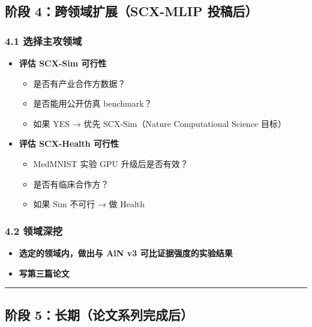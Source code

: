 \documentclass[
  12pt,
]{ctexart}
\providecommand{\tightlist}{%
  \setlength{\itemsep}{0pt}\setlength{\parskip}{0pt}}
\begin{document}
\subsection{阶段 4：跨领域扩展（SCX-MLIP
投稿后）}\label{ux9636ux6bb5-4ux8de8ux9886ux57dfux6269ux5c55scx-mlip-ux6295ux7a3fux540e}

\subsubsection{4.1
选择主攻领域}\label{ux9009ux62e9ux4e3bux653bux9886ux57df}

\begin{itemize}
\tightlist
\item[$\square$]
  \textbf{评估 SCX-Sim 可行性}

  \begin{itemize}
  \tightlist
  \item
    是否有产业合作方数据？
  \item
    是否能用公开仿真 benchmark？
  \item
    如果 YES → 优先 SCX-Sim（Nature Computational Science 目标）
  \end{itemize}
\item[$\square$]
  \textbf{评估 SCX-Health 可行性}

  \begin{itemize}
  \tightlist
  \item
    MedMNIST 实验 GPU 升级后是否有效？
  \item
    是否有临床合作方？
  \item
    如果 Sim 不可行 → 做 Health
  \end{itemize}
\end{itemize}

\subsubsection{4.2 领域深挖}\label{ux9886ux57dfux6df1ux6316}

\begin{itemize}
\tightlist
\item[$\square$]
  \textbf{选定的领域内，做出与 AlN v3 可比证据强度的实验结果}
\item[$\square$]
  \textbf{写第三篇论文}
\end{itemize}

\begin{center}\rule{0.5\linewidth}{0.5pt}\end{center}

\subsection{阶段
5：长期（论文系列完成后）}\label{ux9636ux6bb5-5ux957fux671fux8bbaux6587ux7cfbux5217ux5b8cux6210ux540e}
\end{document}
